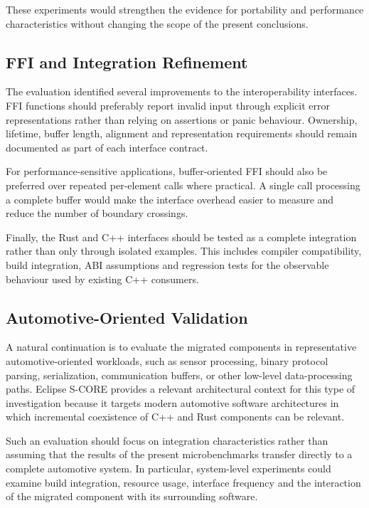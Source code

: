 These experiments would strengthen the evidence for portability and
performance characteristics without changing the scope of the present
conclusions.

\subsection{FFI and Integration Refinement}

The evaluation identified several improvements to the interoperability
interfaces. FFI functions should preferably report invalid input through
explicit error representations rather than relying on assertions or panic
behaviour. Ownership, lifetime, buffer length, alignment and representation
requirements should remain documented as part of each interface contract.

For performance-sensitive applications, buffer-oriented FFI should also be
preferred over repeated per-element calls where practical. A single call
processing a complete buffer would make the interface overhead easier to
measure and reduce the number of boundary crossings.

Finally, the Rust and C++ interfaces should be tested as a complete
integration rather than only through isolated examples. This includes
compiler compatibility, build integration, ABI assumptions and regression
tests for the observable behaviour used by existing C++ consumers.

\subsection{Automotive-Oriented Validation}

A natural continuation is to evaluate the migrated components in
representative automotive-oriented workloads, such as sensor processing,
binary protocol parsing, serialization, communication buffers, or other
low-level data-processing paths. Eclipse S-CORE provides a relevant
architectural context for this type of investigation because it targets
modern automotive software architectures in which incremental coexistence of
C++ and Rust components can be relevant.

Such an evaluation should focus on integration characteristics rather than
assuming that the results of the present microbenchmarks transfer directly
to a complete automotive system. In particular, system-level experiments
could examine build integration, resource usage, interface frequency and the
interaction of the migrated component with its surrounding software.

